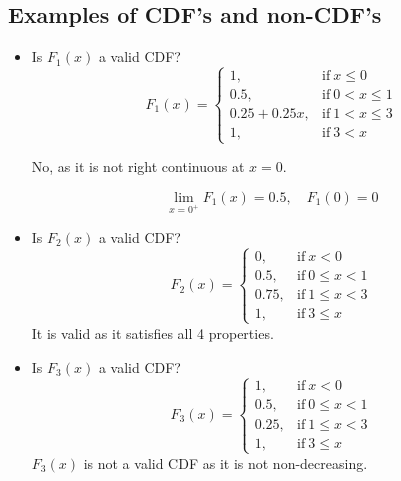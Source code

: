 \documentclass{article}
\begin{document}
\subsection{Examples of CDF's and non-CDF's}
\begin{itemize}
    \item Is $F_1(x)$ a valid CDF?
    \begin{equation*}
        F_1 (x)=
        \begin{cases}
          1, & \text{if}\ x \leq 0 \\
          0.5, & \text{if}\ 0<x\leq 1 \\
          0.25+0.25x, & \text{if}\ 1<x\leq 3 \\
          1, & \text{if}\ 3<x
        \end{cases}
    \end{equation*}

    No, as it is not right continuous at $x=0$.

    $$ \lim_{x=0^+}F_1(x)=0.5, \quad F_1(0)=0$$

    \item Is $F_2(x)$ a valid CDF?
    \begin{equation*}
        F_2 (x)=
        \begin{cases}
          0, & \text{if}\ x < 0 \\
          0.5, & \text{if}\ 0\leq x < 1 \\
          0.75, & \text{if}\ 1\leq x < 3 \\
          1, & \text{if}\ 3\leq x
        \end{cases}
    \end{equation*}
    It is valid as it satisfies all 4 properties.

    \item Is $F_3(x)$ a valid CDF?
    \begin{equation*}
        F_3 (x)=
        \begin{cases}
          1, & \text{if}\ x < 0 \\
          0.5, & \text{if}\ 0 \leq x < 1 \\
          0.25, & \text{if}\ 1\leq x < 3 \\
          1, & \text{if}\ 3 \leq x
        \end{cases}
    \end{equation*}
    $F_3(x)$ is not a valid CDF as it is not non-decreasing.

\end{itemize}
\end{document}
